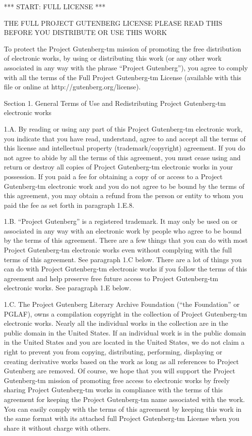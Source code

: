*** START: FULL LICENSE ***

THE FULL PROJECT GUTENBERG LICENSE
PLEASE READ THIS BEFORE YOU DISTRIBUTE OR USE THIS WORK

To protect the Project Gutenberg-tm mission of promoting the free
distribution of electronic works, by using or distributing this work
(or any other work associated in any way with the phrase “Project
Gutenberg”), you agree to comply with all the terms of the Full Project
Gutenberg-tm License (available with this file or online at
http://gutenberg.org/license).


Section 1.  General Terms of Use and Redistributing Project Gutenberg-tm
electronic works

1.A.  By reading or using any part of this Project Gutenberg-tm
electronic work, you indicate that you have read, understand, agree to
and accept all the terms of this license and intellectual property
(trademark/copyright) agreement.  If you do not agree to abide by all
the terms of this agreement, you must cease using and return or destroy
all copies of Project Gutenberg-tm electronic works in your possession.
If you paid a fee for obtaining a copy of or access to a Project
Gutenberg-tm electronic work and you do not agree to be bound by the
terms of this agreement, you may obtain a refund from the person or
entity to whom you paid the fee as set forth in paragraph 1.E.8.

1.B.  “Project Gutenberg” is a registered trademark.  It may only be
used on or associated in any way with an electronic work by people who
agree to be bound by the terms of this agreement.  There are a few
things that you can do with most Project Gutenberg-tm electronic works
even without complying with the full terms of this agreement.  See
paragraph 1.C below.  There are a lot of things you can do with Project
Gutenberg-tm electronic works if you follow the terms of this agreement
and help preserve free future access to Project Gutenberg-tm electronic
works.  See paragraph 1.E below.

1.C.  The Project Gutenberg Literary Archive Foundation (“the Foundation”
 or PGLAF), owns a compilation copyright in the collection of Project
Gutenberg-tm electronic works.  Nearly all the individual works in the
collection are in the public domain in the United States.  If an
individual work is in the public domain in the United States and you are
located in the United States, we do not claim a right to prevent you from
copying, distributing, performing, displaying or creating derivative
works based on the work as long as all references to Project Gutenberg
are removed.  Of course, we hope that you will support the Project
Gutenberg-tm mission of promoting free access to electronic works by
freely sharing Project Gutenberg-tm works in compliance with the terms of
this agreement for keeping the Project Gutenberg-tm name associated with
the work.  You can easily comply with the terms of this agreement by
keeping this work in the same format with its attached full Project
Gutenberg-tm License when you share it without charge with others.

